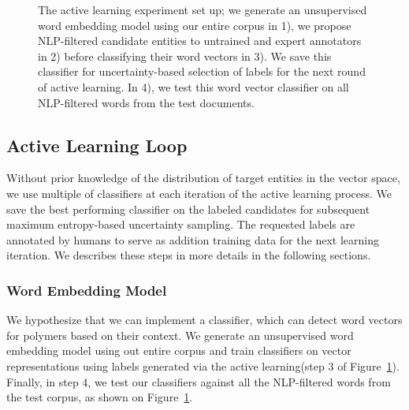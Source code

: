 \begin{figure}[!t]
\centering
{}
\caption{\label{fig:current} The active learning experiment set up; we generate an unsupervised word embedding model using our entire corpus in 1), we propose NLP-filtered candidate entities to untrained and expert annotators in 2) before classifying their word vectors in 3). We save this classifier for uncertainty-based selection of labels for the next round of active learning. In 4), we test this word vector classifier on all NLP-filtered words from the test documents.}
\end{figure}

\subsection{Active Learning Loop}
Without prior knowledge of the distribution of target entities in the vector space, we use multiple of classifiers at each iteration of the active learning process. 
We save the best performing classifier on the labeled candidates for subsequent maximum entropy-based uncertainty sampling. 
The requested labels are annotated by humans to serve as addition training data for the next learning iteration. 
We describes these steps in more details in the following sections.

\subsubsection{Word Embedding Model}
We hypothesize that we can implement a classifier, which can detect word vectors for polymers based on their context. 
We generate an unsupervised word embedding model using out entire corpus and train classifiers on vector representations using labels generated via the active learning(step 3 of Figure~\ref{fig:current}).
Finally, in step 4, we test our classifiers against all the NLP-filtered words from the test corpus, as shown on Figure~\ref{fig:current}.

